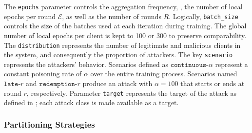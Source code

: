 The \texttt{epochs} parameter controls the aggregation frequency, \ie, the number of local epochs per round $\mathcal{E}$, as well as the number of rounds $R$.
Logically, \texttt{batch\_size} controls the size of the batches used at each iteration during training.
The global number of local epochs per client is kept to 100 or 300 to preserve comparability.
The \texttt{distribution} represents the number of legitimate and malicious clients in the system, and consequently the proportion of attackers.
The key \texttt{scenario} represents the attackers' behavior. 
Scenarios defined as $\texttt{continuous-}\alpha$ represent a constant poisoning rate of $\alpha$ over the entire training process.
Scenarios named $\texttt{late-}r$ and $\texttt{redemption-}r$ produce an attack with $\alpha=100$ that starts or ends at round $r$, respectively.
Parameter \texttt{target} represents the target of the attack as defined in ; each attack class is made available as a target. 


\subsubsection{Partitioning Strategies}


